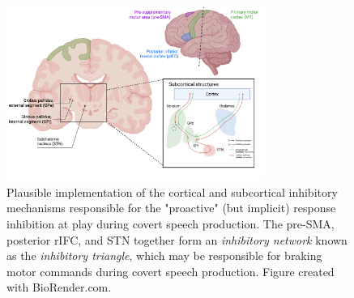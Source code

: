 \documentclass[utf8]{template/frontiersSCNS} %
\begin{document}

\begin{figure}[ht] %
\begin{center}
\includegraphics[width=0.75\textwidth]{figures/inhibitory_triangle.png} %
\end{center}
\caption{Plausible implementation of the cortical and subcortical inhibitory mechanisms responsible for the "proactive" (but implicit) response inhibition at play during covert speech production. The pre-SMA, posterior rIFC, and STN together form an \textit{inhibitory network} known as the \textit{inhibitory triangle}, which may be responsible for braking motor commands during covert speech production. Figure created with BioRender.com.}\label{triangle}
\end{figure}

\end{document}
